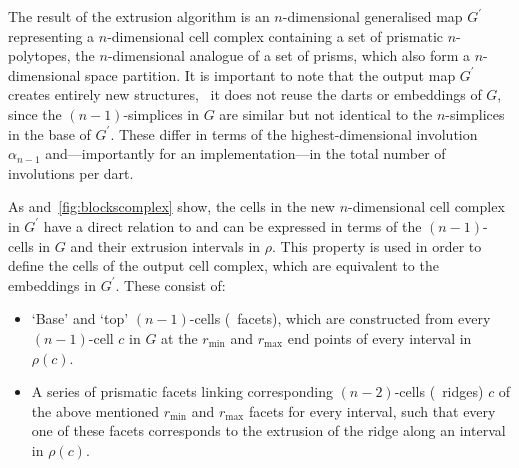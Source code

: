 The result of the extrusion algorithm is an $n$-dimensional generalised map $G^{\prime}$ representing a $n$-dimensional cell complex containing a set of prismatic $n$-polytopes, the $n$-dimensional analogue of a set of prisms, which also form a $n$-dimensional space partition.
It is important to note that the output map $G^\prime$ creates entirely new structures, \ie\ it does not reuse the darts or embeddings of $G$, since the $(n-1)$-simplices in $G$ are similar but not identical to the $n$-simplices in the base of $G^\prime$.
These differ in terms of the highest-dimensional involution $\alpha_{n-1}$ and---importantly for an implementation---in the total number of involutions per dart.

As  and~\ref{fig:blockscomplex} show, the cells in the new $n$-dimensional cell complex in $G^\prime$ have a direct relation to and can be expressed in terms of the $(n-1)$-cells in $G$ and their extrusion intervals in $\rho$.
This property is used in order to define the cells of the output cell complex, which are equivalent to the embeddings in $G^\prime$.
These consist of:
\begin{itemize}
\item
`Base' and `top' $(n-1)$-cells (\ie\ facets), which are constructed from every $(n-1)$-cell $c$ in $G$ at the $r_{\min}$ and $r_{\max}$ end points of every interval in $\rho(c)$.
\item
A series of prismatic facets linking corresponding $(n-2)$-cells (\ie\ ridges) $c$ of the above mentioned $r_{\min}$ and $r_{\max}$ facets for every interval, such that every one of these facets corresponds to the extrusion of the ridge along an interval in $\rho(c)$. 
\end{itemize}

